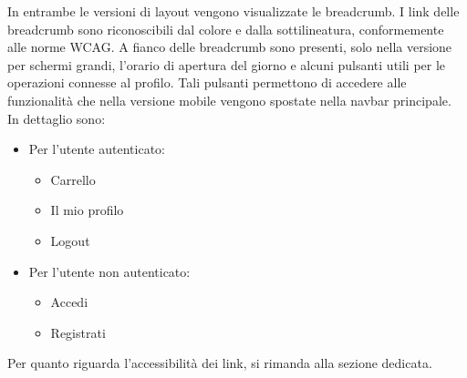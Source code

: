 In entrambe le versioni di layout vengono visualizzate le breadcrumb. I link delle breadcrumb sono riconoscibili dal colore e dalla sottilineatura, conformemente alle norme WCAG. A fianco delle breadcrumb sono presenti, solo nella versione per schermi grandi, l'orario di apertura del giorno e alcuni pulsanti utili per le operazioni connesse al profilo. Tali pulsanti permettono di accedere alle funzionalità che nella versione mobile vengono spostate nella navbar principale. In dettaglio sono:
\begin{itemize}
    \item Per l'utente autenticato:
    \begin{itemize}
        \item Carrello
        \item Il mio profilo
        \item Logout
    \end{itemize}
    \item Per l'utente non autenticato:
    \begin{itemize}
        \item Accedi
        \item Registrati
    \end{itemize}
\end{itemize}
Per quanto riguarda l'accessibilità dei link, si rimanda alla sezione dedicata.

